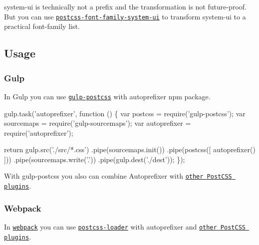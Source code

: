 {\ttfamily system-\/ui} is technically not a prefix and the transformation is not future-\/proof. But you can use \href{https://github.com/JLHwung/postcss-font-family-system-ui}{\tt postcss-\/font-\/family-\/system-\/ui} to transform {\ttfamily system-\/ui} to a practical font-\/family list.

\subsection*{Usage}

\subsubsection*{Gulp}

In Gulp you can use \href{https://github.com/postcss/gulp-postcss}{\tt gulp-\/postcss} with {\ttfamily autoprefixer} npm package.


\begin{DoxyCode}
gulp.task('autoprefixer', function () \{
    var postcss      = require('gulp-postcss');
    var sourcemaps   = require('gulp-sourcemaps');
    var autoprefixer = require('autoprefixer');

    return gulp.src('./src/*.css')
        .pipe(sourcemaps.init())
        .pipe(postcss([ autoprefixer() ]))
        .pipe(sourcemaps.write('.'))
        .pipe(gulp.dest('./dest'));
\});
\end{DoxyCode}


With {\ttfamily gulp-\/postcss} you also can combine Autoprefixer with \href{https://github.com/postcss/postcss#plugins}{\tt other Post\+C\+SS plugins}.

\subsubsection*{Webpack}

In \href{http://webpack.github.io/}{\tt webpack} you can use \href{https://github.com/postcss/postcss-loader}{\tt postcss-\/loader} with {\ttfamily autoprefixer} and \href{https://github.com/postcss/postcss#plugins}{\tt other Post\+C\+SS plugins}.




